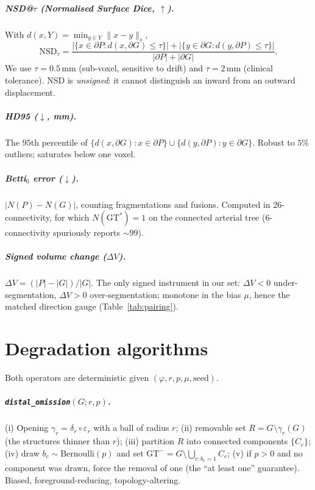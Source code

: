 \documentclass[
    bookmarks, bookmarksnumbered, bookmarksopen,
    colorlinks=true, citecolor=blue, linkcolor=blue, urlcolor=blue
]{techrep}
\newcommand{\gtstar}{\ensuremath{\mathrm{GT}^{\!*}}}
\newcommand{\gtminus}{\ensuremath{\mathrm{GT}^{\!-}}}
\begin{document}
\paragraph{NSD@$\tau$ (Normalised Surface Dice, $\uparrow$).} With $d(x,Y)=\min_{y\in Y}\|x-y\|_s$,
\[
  \text{NSD}_\tau=\frac{|\{x\in\partial P: d(x,\partial G)\le\tau\}|+|\{y\in\partial G: d(y,\partial P)\le\tau\}|}{|\partial P|+|\partial G|}.
\]
We use $\tau=0.5$\,mm (sub-voxel, sensitive to drift) and $\tau=2$\,mm (clinical tolerance).
NSD is \emph{unsigned}: it cannot distinguish an inward from an outward displacement.

\paragraph{HD95 ($\downarrow$, mm).} The $95$th percentile of
$\{d(x,\partial G):x\in\partial P\}\cup\{d(y,\partial P):y\in\partial G\}$. Robust to $5\%$
outliers; saturates below one voxel.

\paragraph{Betti$_0$ error ($\downarrow$).} $|N(P)-N(G)|$, counting fragmentations and
fusions. Computed in 26-connectivity, for which $N(\gtstar){=}1$ on the connected arterial
tree (6-connectivity spuriously reports $\sim99$).

\paragraph{Signed volume change ($\Delta V$).} $\Delta V=(|P|-|G|)/|G|$. The only signed
instrument in our set: $\Delta V<0$ under-segmentation, $\Delta V>0$ over-segmentation;
monotone in the bias $\mu$, hence the matched direction gauge (Table~\ref{tab:pairing}).

\chapter{Degradation algorithms}\label{app:algos}
Both operators are deterministic given $(\varphi,r,p,\mu,\text{seed})$.

\paragraph{\texttt{distal\_omission}$(G;r,p)$.} (i) Opening $\gamma_r=\delta_r\circ\varepsilon_r$
with a ball of radius $r$; (ii) removable set $R=G\setminus\gamma_r(G)$ (the structures thinner
than $r$); (iii) partition $R$ into connected components $\{C_c\}$; (iv) draw
$b_c\sim\text{Bernoulli}(p)$ and set $\gtminus=G\setminus\bigcup_{c:b_c=1}C_c$; (v) if $p>0$ and
no component was drawn, force the removal of one (the ``at least one'' guarantee). Biased,
foreground-reducing, topology-altering.
\end{document}
